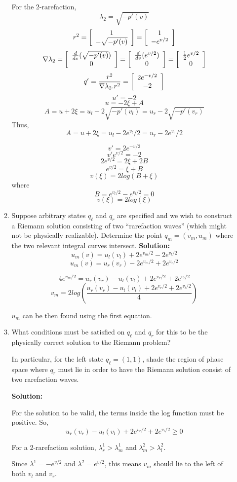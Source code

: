 \documentclass[11pt]{article}
\newenvironment{mat}{\left[ \begin{array}{ccccccccccccc}}{\end{array}\right]}
\newcommand\bcm{\begin{mat}}
\newcommand\ecm{\end{mat}}
\begin{document}
\begin{enumerate}
\begin{enumerate}
For the 2-rarefaction,
\[\lambda_2= \sqrt{-p'(v)}\]
\[r^2 = \bcm 1\\  -\sqrt{-p'(v)}\ecm= \bcm 1\\  -e^{v/2}\ecm\]
\[\nabla \lambda_2 = \bcm \frac{d}{dv} ( \sqrt{-p'(v)})\\0 \ecm  = \bcm \frac{d}{dv} ( e^{v/2})\\0 \ecm = \bcm  \frac{1}{2} e^{v/2}\\0 \ecm\] 
\[ q' = \frac{r^2}{\nabla \lambda_2 .r^2}= \bcm  2 e^{-v/2}\\-2 \ecm\]
\[ u' = -2 \]
\[ u = -2 \xi +A \]
\[A= u + 2\xi = u_l - 2 \sqrt{- p'(v_l)} =u_r - 2 \sqrt{- p'(v_r)} \]
Thus,
\[A= u + 2\xi = u_l - 2 e^{{v_l}}/2 =u_r - 2 e^{{v_r}}/2 \]

\[ v' =2 e^{-v/2} \]
\[ v' e^{v/2}=-2 \]
\[ 2e^{v/2}=2\xi +2B\]
\[ e^{v/2}=\xi +B\]
\[ v(\xi)=2 log(B+\xi) \]
where
\[ B= e^{v_l/2} -e^{v_l/2} =0  \]
\[ v(\xi)=2 log(\xi) \]

\item Suppose arbitrary states $q_\ell$ and $q_r$ are specified and we wish to
construct a Riemann solution consisting of two ``rarefaction waves'' (which
might not be physically realizable).   Determine the point $q_m =
(v_m,u_m)$ where the two relevant integral curves intersect.
\vskip 1cm
{\bf Solution:}
\[u_m(v)=u_l(v_l)+ 2e^{v_m/2}-2e^{v_l/2} \]
\[u_m(v)=u_r(v_r)- 2e^{v_m/2}+2e^{v_r/2} \]

\[4e^{v_m/2}=u_r(v_r)-u_l(v_l)+2e^{v_r/2} +2e^{v_l/2}\]
\[v_m=2log(\frac{u_r(v_r)-u_l(v_l)+2e^{v_r/2} +2e^{v_l/2}}{4})\]

$u_m$ can be then found using the first equation.


\item What conditions must be satisfied on $q_\ell$ and $q_r$ for this to be
the physically correct solution to the Riemann problem?


In particular, for the left state $q_\ell = (1,1)$, 
shade the region of phase space where $q_r$ must lie in order to have the
Riemann solution consist of two rarefaction waves.

\vskip 1cm
{\bf Solution:}

For the solution to be valid, the terms inside the log function must be positive. So,
\[u_r(v_r)-u_l(v_l)+2e^{v_r/2} +2e^{v_l/2} \geq 0 \]



For a 2-rarefaction solution, $ \lambda^1_r >\lambda^1_m$ and $\lambda^2_m  > \lambda^2_l $. 

Since $\lambda^1 = -e^{v/2}$ and $\lambda^2 = e^{v/2}$, this means $v_m$ should lie to the left of both $v_l$ and $v_r$.


\end{enumerate}
\end{enumerate}
\end{document}
